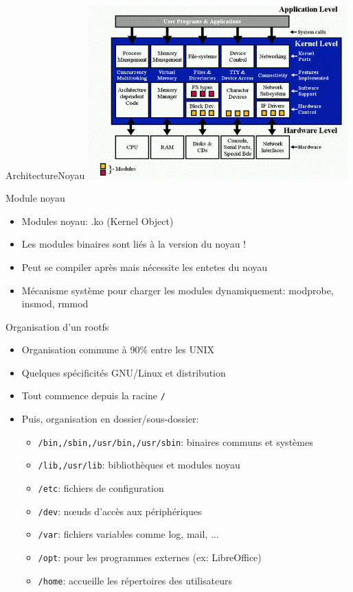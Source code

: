 \begin{frame}{Architecture}{Noyau}
  \includegraphics[width=10cm]{pictures/01_cours_magistral/kernel_arch.png}
\end{frame}

\begin{frame}{Module noyau}
  \begin{itemize}
  \item Modules noyau: .ko (Kernel Object)
  \item Les modules binaires sont liés à la version du noyau !
  \item Peut se compiler après mais nécessite les entetes du noyau
  \item Mécanisme système pour charger les modules dynamiquement: modprobe, insmod, rmmod
  \end{itemize}
\end{frame}

\begin{frame}{Organisation d'un rootfs}
  \begin{itemize}
  \item Organisation commune à 90\% entre les UNIX
  \item Quelques spécificités GNU/Linux et distribution
  \item Tout commence depuis la racine \texttt{/}
  \item Puis, organisation en dossier/sous-dossier:
    \begin{itemize}
    \item \texttt{/bin,/sbin,/usr/bin,/usr/sbin}: binaires communs et systèmes
    \item \texttt{/lib,/usr/lib}: bibliothèques et modules noyau
    \item \texttt{/etc}: fichiers de configuration
    \item \texttt{/dev}: nœuds d'accès aux périphériques
    \item \texttt{/var}: fichiers variables comme log, mail, ...
    \item \texttt{/opt}: pour les programmes externes (ex: LibreOffice)
    \item \texttt{/home}: accueille les répertoires des utilisateurs
    \end{itemize}
  \end{itemize}
\end{frame}

